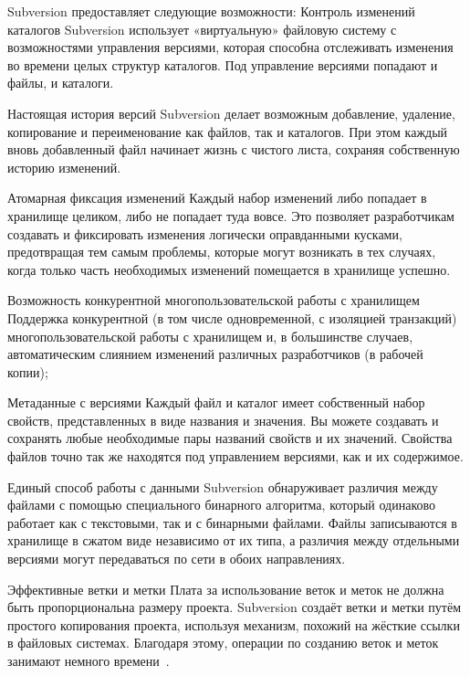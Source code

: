 \documentclass{../industrial-development}
\begin{document}
\lecturenotes

Subversion предоставляет следующие возможности:
Контроль изменений каталогов 
Subversion использует «виртуальную» файловую систему с возможностями управления версиями, которая способна отслеживать изменения во времени целых структур каталогов. Под управление версиями попадают и файлы, и каталоги.

Настоящая история версий 
Subversion делает возможным добавление, удаление, копирование и переименование как файлов, так и каталогов. При этом каждый вновь добавленный файл начинает жизнь с чистого листа, сохраняя собственную историю изменений.

Атомарная фиксация изменений 
Каждый набор изменений либо попадает в хранилище целиком, либо не попадает туда вовсе. Это позволяет разработчикам создавать и фиксировать изменения логически оправданными кусками, предотвращая тем самым проблемы, которые могут возникать в тех случаях, когда только часть необходимых изменений помещается в хранилище успешно.

Возможность конкурентной многопользовательской работы с хранилищем
Поддержка конкурентной (в том числе одновременной, с изоляцией транзакций) многопользовательской работы с хранилищем и, в большинстве случаев, автоматическим слиянием изменений различных разработчиков (в рабочей копии);

Метаданные с версиями 
Каждый файл и каталог имеет собственный набор свойств, представленных в виде названия и значения. Вы можете создавать и сохранять любые необходимые пары названий свойств и их значений. Свойства файлов точно так же находятся под управлением версиями, как и их содержимое.

Единый способ работы с данными 
Subversion обнаруживает различия между файлами с помощью специального бинарного алгоритма, который одинаково работает как с текстовыми, так и с бинарными файлами. Файлы записываются в хранилище в сжатом виде независимо от их типа, а различия между отдельными версиями могут передаваться по сети в обоих направлениях.

Эффективные ветки и метки 
Плата за использование веток и меток не должна быть пропорциональна размеру проекта. Subversion создаёт ветки и метки путём простого копирования проекта, используя механизм, похожий на жёсткие ссылки в файловых системах. Благодаря этому, операции по созданию веток и меток занимают немного времени~\cite[с.~14--15]{VSwithSVN}.
\end{document}
